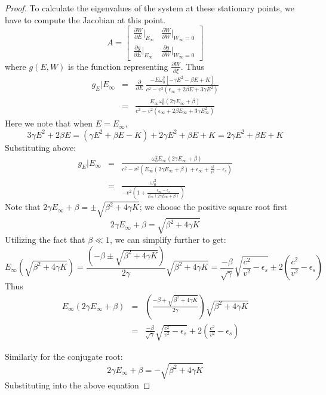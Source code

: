\documentclass{article}[12pt]
\theoremstyle{plain}
\begin{document}
\begin{proof}
To calculate the eigenvalues of the system at these stationary points, we have
to compute the Jacobian at this point.
\[
A = \begin{bmatrix} \frac{\partial W}{\partial E}|_{E_\infty} & \frac{\partial W}{\partial W}|_{W_\infty=0} \\
\frac{\partial g}{\partial E}|_{E_\infty} & \frac{\partial g}{\partial W}|_{W_\infty=0}
\end{bmatrix}
\]
where $g(E,W)$ is the function representing $\frac{\partial W}{\partial \xi}$.
Thus
\begin{eqnarray}
g_E|E_\infty & = & \frac{\partial}{\partial E}\ \frac{-E \omega_0^2 [ -\gamma E^2 - \beta E + K ]}
{c^2 - v^2(\epsilon_\infty +2\beta E + 3\gamma E^2)}\\
& = & \frac{ E_\infty\omega_0^2 (2\gamma E_\infty + \beta ) }
{c^2 - v^2(\epsilon_\infty +2\beta E_\infty + 3\gamma E_\infty^2)}
\end{eqnarray}
Here we note that when $E=E_\infty$,
\[
3\gamma E^2 + 2\beta E = (\gamma E^2 + \beta E - K) + 2\gamma E^2 + \beta E + K
= 2\gamma E^2 + \beta E + K
\]
Substituting above:
\begin{eqnarray}
g_E|E_\infty & = & \frac{ \omega_0^2 E_\infty(2\gamma E_\infty + \beta ) }
{c^2 - v^2(E_\infty(2\gamma E_\infty + \beta) + \epsilon_\infty + \frac{c^2}{v^2}-\epsilon_s)} \\
& = & \frac{\omega_0^2}
{-v^2(1+\frac{\epsilon_\infty - \epsilon_s}{E_\infty(2\gamma E_\infty + \beta)})} \label{eqn:maineqn}
\end{eqnarray}
Note that $2\gamma E_\infty + \beta =\pm \sqrt{\beta^2+4\gamma K}$; we choose the positive square root first
\[
2\gamma E_\infty + \beta = \sqrt{\beta^2 + 4\gamma K}
\]
Utilizing the fact that $\beta \ll 1$, we can simplify further to get:
\[
E_\infty ( \sqrt{\beta^2 + 4\gamma K}) = \frac{(-\beta \pm \sqrt{\beta^2+4\gamma K})}{2\gamma} \sqrt{\beta^2 + 4\gamma K} = \frac{-\beta}{\sqrt{\gamma}}\sqrt{\frac{c^2}{v^2}-\epsilon_s}
\pm 2(\frac{c^2}{v^2}-\epsilon_s)
\]
Thus
\begin{eqnarray}
E_\infty ( 2\gamma E_\infty + \beta ) & = & (\frac{-\beta + \sqrt{\beta^2 + 4\gamma K}}{2\gamma})\sqrt{\beta^2 + 4\gamma K} \\
& = & \frac{-\beta}{\sqrt{\gamma}}\sqrt{\frac{c^2}{v^2}-\epsilon_s} + 2(\frac{c^2}{v^2}-\epsilon_s)\label{eqn:pos}
\end{eqnarray}

Similarly for the conjugate root:
\begin{equation}
2\gamma E_\infty + \beta = -\sqrt{\beta^2 + 4\gamma K}
\end{equation}
Substituting into the above equation


\end{proof}
\end{document}
